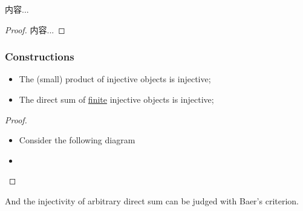 \documentclass[Total.tex]{subfiles}
\begin{document}
					\begin{lemma}
						内容...
					\end{lemma}
					\begin{proof}
						内容...
					\end{proof}
					\subsubsection{Constructions}
					\begin{proposition}
						\begin{itemize}
							\item The (small) product of injective objects is injective;
							\item The direct sum of \underline{finite} injective objects is injective;
						\end{itemize}
					\end{proposition}
					\begin{proof}
						\begin{itemize}
							\item Consider the following diagram
							\begin{center}
							\end{center}
							\item \begin{center}
							\end{center}
						\end{itemize}
					\end{proof}
					And the injectivity of arbitrary direct sum can be judged with Baer's criterion.
\end{document}
